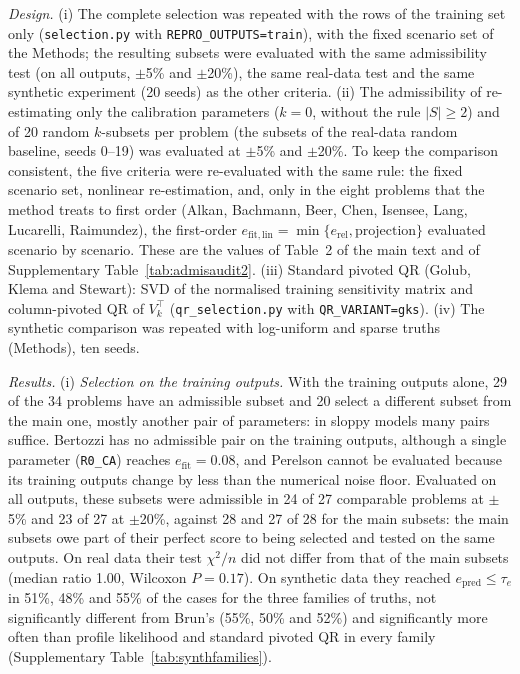 \emph{Design.} (i) The complete selection was repeated with the rows of the training set only (\texttt{selection.py} with \texttt{REPRO\_OUTPUTS=train}), with the fixed scenario set of the Methods; the resulting subsets were evaluated with the same admissibility test (on all outputs, $\pm$5\% and $\pm$20\%), the same real-data test and the same synthetic experiment (20 seeds) as the other criteria. (ii) The admissibility of re-estimating only the calibration parameters ($k=0$, without the rule $|S|\ge2$) and of 20 random $k$-subsets per problem (the subsets of the real-data random baseline, seeds 0--19) was evaluated at $\pm$5\% and $\pm$20\%. To keep the comparison consistent, the five criteria were re-evaluated with the same rule: the fixed scenario set, nonlinear re-estimation, and, only in the eight problems that the method treats to first order (Alkan, Bachmann, Beer, Chen, Isensee, Lang, Lucarelli, Raimundez), the first-order $e_{\mathrm{fit,lin}}=\min\{e_{\mathrm{rel}},\text{projection}\}$ evaluated scenario by scenario. These are the values of Table~2 of the main text and of Supplementary Table~\ref{tab:admisaudit2}. (iii) Standard pivoted QR (Golub, Klema and Stewart): SVD of the normalised training sensitivity matrix and column-pivoted QR of $V_k^{\top}$ (\texttt{qr\_selection.py} with \texttt{QR\_VARIANT=gks}). (iv) The synthetic comparison was repeated with log-uniform and sparse truths (Methods), ten seeds.

\emph{Results.} (i) \emph{Selection on the training outputs.} With the training outputs alone, 29 of the 34 problems have an admissible subset and 20 select a different subset from the main one, mostly another pair of parameters: in sloppy models many pairs suffice. Bertozzi has no admissible pair on the training outputs, although a single parameter (\texttt{R0\_CA}) reaches $e_{\mathrm{fit}}=0.08$, and Perelson cannot be evaluated because its training outputs change by less than the numerical noise floor. Evaluated on all outputs, these subsets were admissible in 24 of 27 comparable problems at $\pm$5\% and 23 of 27 at $\pm$20\%, against 28 and 27 of 28 for the main subsets: the main subsets owe part of their perfect score to being selected and tested on the same outputs. On real data their test $\chi^2/n$ did not differ from that of the main subsets (median ratio 1.00, Wilcoxon $P=0.17$). On synthetic data they reached $e_{\mathrm{pred}}\le\tau_e$ in 51\%, 48\% and 55\% of the cases for the three families of truths, not significantly different from Brun's (55\%, 50\% and 52\%) and significantly more often than profile likelihood and standard pivoted QR in every family (Supplementary Table~\ref{tab:synthfamilies}).

